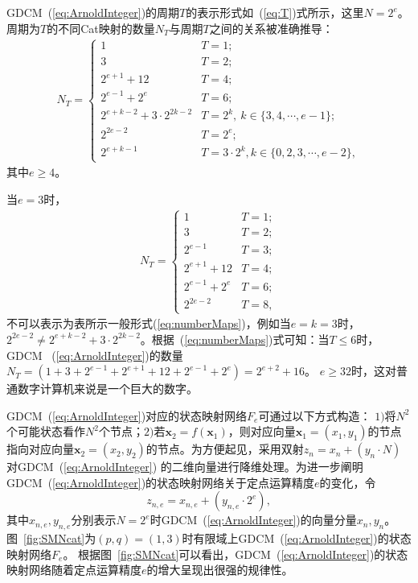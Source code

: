 GDCM~(\ref{eq:ArnoldInteger})的周期$T$的表示形式如~(\ref{eq:T})式所示，这里$N=2^e$。
周期为$T$的不同Cat映射的数量$N_T$与周期$T$之间的关系被准确推导：
\begin{eqnarray}
N_T=
\begin{cases}
1                         & T=1;  \\
3                         & T=2;  \\	
2^{e+1}+12                & T=4;  \\
2^{e-1}+2^{e}             & T=6;  \\
2^{e+k-2}+3\cdot 2^{2k-2} & T=2^k,\ k\in \{3, 4, \cdots, e-1\};\\
2^{2e-2}                  & T=2^e; \\
2^{e+k-1}                 & T=3\cdot 2^k, k\in \{0, 2, 3, \cdots, e-2\},
\end{cases}
\label{eq:numberMaps}
\end{eqnarray}
其中$e\ge 4$。

当$e=3$时，
\begin{eqnarray*}
N_T=\begin{cases}
	1              & T=1;  \\
	3              & T=2;  \\	
    2^{e-1}        & T=3;  \\	
	2^{e+1}+12     & T=4;  \\
	2^{e-1}+2^{e}  & T=6;  \\		
	2^{2e-2}       & T=8,
\end{cases}
\end{eqnarray*}
不可以表示为表\cite[Table III]{Catchen2013period2e}所示一般形式(\ref{eq:numberMaps})，例如当$e=k=3$时，
$2^{2e-2}\neq 2^{e+k-2}+3\cdot 2^{2k-2}$。根据~(\ref{eq:numberMaps})式可知：当$T\le 6$时，GDCM
~(\ref{eq:ArnoldInteger})的数量$N_T=(1+3+2^{e-1}+2^{e+1}+12+2^{e-1}+2^{e})=2^{e+2}+16$。
$e\ge 32$时，这对普通数字计算机来说是一个巨大的数字。

GDCM~(\ref{eq:ArnoldInteger})对应的状态映射网络$F_e$可通过以下方式构造：
$1)$将$N^2$个可能状态看作$N^2$个节点；$2)$若$\textbf{x}_2=f(\textbf{x}_1)$，则对应向量$\textbf{x}_1=(x_1, y_1)$的节点
指向对应向量$\textbf{x}_2=(x_2, y_2)$的节点。为方便起见，采用双射$z_n=x_{n} + (y_{n} \cdot N)$对GDCM~(\ref{eq:ArnoldInteger})
的二维向量进行降维处理。为进一步阐明GDCM~(\ref{eq:ArnoldInteger})的状态映射网络关于定点运算精度$e$的变化，令
\begin{equation}
z_{n, e} = x_{n, e} + (y_{n, e} \cdot 2^e),
\label{eq:quantization}
\end{equation}
其中$x_{n, e}, y_{n, e}$分别表示$N=2^e$时GDCM~(\ref{eq:ArnoldInteger})的向量分量$x_{n}, y_{n}$。
图~\ref{fig:SMNcat}为$(p, q)=(1, 3)$时有限域上GDCM~(\ref{eq:ArnoldInteger})的状态映射网络$F_e$。
根据图~\ref{fig:SMNcat}可以看出，GDCM~(\ref{eq:ArnoldInteger})的状态映射网络随着定点运算精度$e$的增大呈现出很强的规律性。

